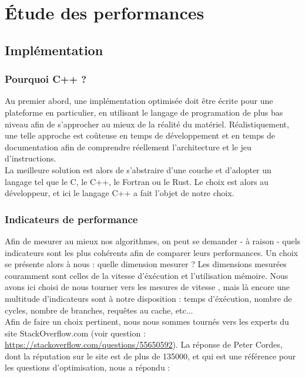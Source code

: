 \newpage
\section{Étude des performances}

\subsection{Implémentation}
\subsubsection{Pourquoi C++ ?}
Au premier abord, une implémentation optimisée doit être écrite pour une plateforme en particulier, en utilisant le langage de programation de plus bas niveau afin de s'approcher au mieux de la réalité du matériel. Réalistiquement, une telle approche est coûteuse en temps de développement et en temps de documentation afin de comprendre réellement l'architecture et le jeu d'instructions. \\

La meilleure solution est alors de s'abstraire d'une couche et d'adopter un langage tel que le C, le C++, le Fortran ou le Rust. Le choix est alors au développeur, et ici le langage C++ a fait l'objet de notre choix.\\



\subsubsection{Indicateurs de performance}
Afin de mesurer au mieux nos algorithmes, on peut se demander - à raison - quels indicateurs sont les plus cohérents afin de comparer leurs performances. Un choix se présente alors à nous : quelle dimension mesurer ? Les dimensions mesurées couramment sont celles de la vitesse d'éxécution et l'utilisation mémoire. Nous avons ici choisi de nous tourner vers les mesures de vitesse , mais là encore une multitude d'indicateurs sont à notre disposition : temps d'éxécution, nombre de cycles, nombre de branches, requêtes au cache, etc...\\

Afin de faire un choix pertinent, nous nous sommes tournés vers les experts du site StackOverflow.com (voir question : \url{https://stackoverflow.com/questions/55650592}). La réponse de Peter Cordes, dont la réputation sur le site est de plus de 135000, et qui est une référence pour les questions d'optimisation, nous a répondu :\\

